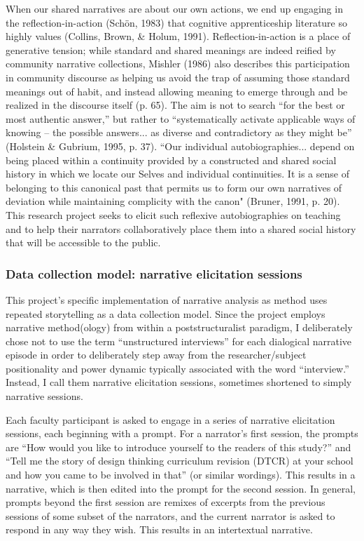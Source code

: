 When our shared narratives are about our own actions, we end up engaging in the reflection-in-action (Schön, 1983) that cognitive apprenticeship literature so highly values (Collins, Brown, & Holum, 1991). Reflection-in-action is a place of generative tension; while standard and shared meanings are indeed reified by community narrative collections, Mishler (1986) also describes this participation in community discourse as helping us avoid the trap of assuming those standard meanings out of habit, and instead allowing meaning to emerge through and be realized in the discourse itself (p. 65). The aim is not to search “for the best or most authentic answer,” but rather to “systematically activate applicable ways of knowing – the possible answers... as diverse and contradictory as they might be” (Holstein & Gubrium, 1995, p. 37). “Our individual autobiographies... depend on being placed within a continuity provided by a constructed and shared social history in which we locate our Selves and individual continuities. It is a sense of belonging to this canonical past that permits us to form our own narratives of deviation while maintaining complicity with the canon" (Bruner, 1991, p. 20). This research project seeks to elicit such reflexive autobiographies on teaching and to help their narrators collaboratively place them into a shared social history that will be accessible to the public.

\subsubsection{Data collection model: narrative elicitation sessions}

This project’s specific implementation of narrative analysis as method uses repeated storytelling as a data collection model. Since the project employs narrative method(ology) from within a poststructuralist paradigm, I deliberately chose not to use the term “unstructured interviews” for each dialogical narrative episode in order to deliberately step away from the researcher/subject positionality and power dynamic typically associated with the word “interview.” Instead, I call them narrative elicitation sessions, sometimes shortened to simply narrative sessions.

Each faculty participant is asked to engage in a series of narrative elicitation sessions, each beginning with a prompt. For a narrator’s first session, the prompts are “How would you like to introduce yourself to the readers of this study?” and “Tell me the story of design thinking curriculum revision (DTCR) at your school and how you came to be involved in that” (or similar wordings). This results in a narrative, which is then edited into the prompt for the second session. In general, prompts beyond the first session are remixes of excerpts from the previous sessions of some subset of the narrators, and the current narrator is asked to respond in any way they wish. This results in an intertextual narrative.

